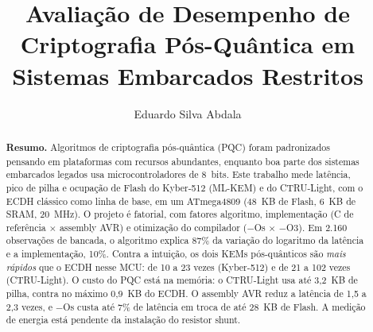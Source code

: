 \documentclass[acmsmall,nonacm,language=english,language=brazilian]{acmart}
\begin{document}
\title{Avaliação de Desempenho de Criptografia Pós-Quântica em Sistemas
       Embarcados Restritos}

\author{Eduardo Silva Abdala}
\email{[email]}  %

\renewcommand{\shortauthors}{Abdala}

\begin{abstract}
\noindent\textbf{Resumo.}\space
Algoritmos de criptografia pós-quântica (PQC) foram padronizados pensando em
plataformas com recursos abundantes, enquanto boa parte dos sistemas embarcados
legados usa microcontroladores de 8~bits. Este trabalho mede latência, pico de
pilha e ocupação de Flash do Kyber-512 (ML-KEM) e do CTRU-Light, com o ECDH
clássico como linha de base, em um ATmega4809 (48~KB de Flash, 6~KB de SRAM,
20~MHz). O projeto é fatorial, com fatores algoritmo, implementação (C de
referência $\times$ assembly AVR) e otimização do compilador ($-$Os $\times$
$-$O3). Em 2.160 observações de bancada, o algoritmo explica 87\% da variação do
logaritmo da latência e a implementação, 10\%. Contra a intuição, os dois KEMs
pós-quânticos são \emph{mais rápidos} que o ECDH nesse MCU: de 10 a 23 vezes
(Kyber-512) e de 21 a 102 vezes (CTRU-Light). O custo do PQC está na memória:
o CTRU-Light usa até 3,2~KB de pilha, contra no máximo 0,9~KB do ECDH. O
assembly AVR reduz a latência de 1,5 a 2,3 vezes, e $-$Os custa até 7\% de
latência em troca de até 28~KB de Flash. A medição de energia está pendente da
instalação do resistor shunt.
\end{abstract}
\end{document}
